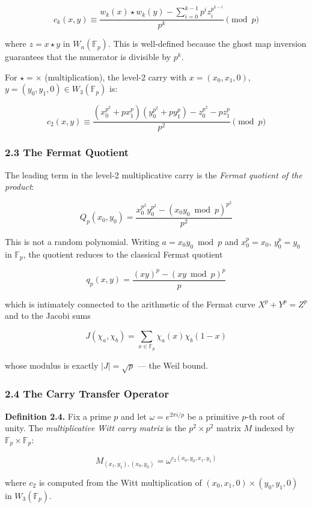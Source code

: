 \documentclass[
  11pt,
]{article}
\begin{document}
\[c_k(x, y) \equiv \frac{w_k(x) \star w_k(y) - \sum_{i=0}^{k-1} p^i z_i^{p^{k-i}}}{p^k} \pmod{p}\]

where \(z = x \star y\) in \(W_n(\mathbb{F}_p)\). This is well-defined because
the ghost map inversion guarantees that the numerator is divisible by \(p^k\).

For \(\star = \times\) (multiplication), the level-2 carry with
\(x = (x_0, x_1, 0)\), \(y = (y_0, y_1, 0) \in W_3(\mathbb{F}_p)\) is:

\[c_2(x, y) \equiv \frac{(x_0^{p^2} + p x_1^p)(y_0^{p^2} + p y_1^p) - z_0^{p^2} - p z_1^p}{p^2} \pmod{p}\]

\subsubsection{2.3 The Fermat Quotient}\label{the-fermat-quotient}

The leading term in the level-2 multiplicative carry is the \emph{Fermat
quotient of the product}:

\[Q_p(x_0, y_0) = \frac{x_0^{p^2} y_0^{p^2} - (x_0 y_0 \bmod p)^{p^2}}{p^2}\]

This is not a random polynomial. Writing \(a = x_0 y_0 \bmod p\) and
\(x_0^p = x_0\), \(y_0^p = y_0\) in \(\mathbb{F}_p\), the quotient reduces to
the classical Fermat quotient

\[q_p(x, y) = \frac{(xy)^p - (xy \bmod p)^p}{p}\]

which is intimately connected to the arithmetic of the Fermat curve
\(X^p + Y^p = Z^p\) and to the Jacobi sums

\[J(\chi_a, \chi_b) = \sum_{x \in \mathbb{F}_p} \chi_a(x) \chi_b(1-x)\]

whose modulus is exactly \(\lvert J\rvert = \sqrt{p}\) --- the Weil bound.

\subsubsection{2.4 The Carry Transfer
Operator}\label{the-carry-transfer-operator}

\textbf{Definition 2.4.} Fix a prime \(p\) and let \(\omega = e^{2\pi i/p}\) be
a primitive \(p\)-th root of unity. The \emph{multiplicative Witt carry matrix}
is the \(p^2 \times p^2\) matrix \(M\) indexed by
\(\mathbb{F}_p \times \mathbb{F}_p\):

\[M_{(x_1,y_1),(x_0,y_0)} = \omega^{c_2(x_0, y_0, x_1, y_1)}\]

where \(c_2\) is computed from the Witt multiplication of
\((x_0, x_1, 0) \times (y_0, y_1, 0)\) in \(W_3(\mathbb{F}_p)\).
\end{document}
